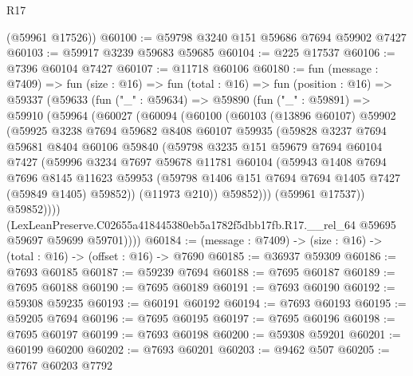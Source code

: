\begin{lexlean}{R17}
\begin{coremodule}
      (@59961 @17526))
@60100 := @59798 @3240 @151 @59686 @7694 @59902 @7427
@60103 := @59917 @3239 @59683 @59685
@60104 := @225 @17537
@60106 := @7396 @60104 @7427
@60107 := @11718 @60106
@60180 := fun (message : @7409) =>
  fun (size : @16) =>
  fun (total : @16) =>
  fun (position : @16) =>
  @59337
    (@59633
      (fun ("_" : @59634) =>
      @59890
        (fun ("_" : @59891) =>
        @59910
          (@59964
            (@60027
              (@60094
                (@60100
                  (@60103
                    (@13896 @60107)
                    @59902
                    (@59925
                      @3238
                      @7694
                      @59682
                      @8408
                      @60107
                      @59935
                      (@59828
                        @3237
                        @7694
                        @59681
                        @8404
                        @60106
                        @59840
                        (@59798
                          @3235
                          @151
                          @59679
                          @7694
                          @60104
                          @7427
                          (@59996
                            @3234
                            @7697
                            @59678
                            @11781
                            @60104
                            (@59943
                              @1408
                              @7694
                              @7696
                              @8145
                              @11623
                              @59953
                              (@59798 @1406 @151 @7694 @7694 @1405 @7427 (@59849 @1405) @59852))
                            (@11973 @210))
                          @59852)))
                    (@59961 @17537))
                  @59852))))
          (LexLeanPreserve.C02655a418445380eb5a1782f5dbb17fb.R17.__rel_64
            @59695
            @59697
            @59699
            @59701))))
@60184 := (message : @7409) -> (size : @16) -> (total : @16) -> (offset : @16) -> @7690
@60185 := @36937 @59309
@60186 := @7693 @60185
@60187 := @59239 @7694
@60188 := @7695 @60187
@60189 := @7695 @60188
@60190 := @7695 @60189
@60191 := @7693 @60190
@60192 := @59308 @59235
@60193 := @60191 @60192
@60194 := @7693 @60193
@60195 := @59205 @7694
@60196 := @7695 @60195
@60197 := @7695 @60196
@60198 := @7695 @60197
@60199 := @7693 @60198
@60200 := @59308 @59201
@60201 := @60199 @60200
@60202 := @7693 @60201
@60203 := @9462 @507
@60205 := @7767 @60203 @7792

\end{coremodule}
\end{lexlean}
